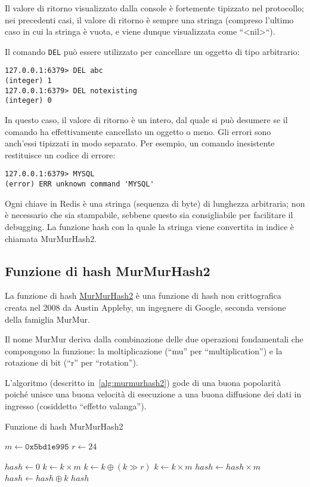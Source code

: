 Il valore di ritorno visualizzato dalla console è fortemente tipizzato nel protocollo;
nei precedenti casi, il valore di ritorno è sempre una stringa (compreso l'ultimo
caso in cui la stringa è vuota, e viene dunque visualizzata come ``<nil>``).

Il comando \verb|DEL| può essere utilizzato per cancellare un oggetto di tipo
arbitrario:

\medskip
\begin{lstlisting}
127.0.0.1:6379> DEL abc
(integer) 1
127.0.0.1:6379> DEL notexisting
(integer) 0
\end{lstlisting}

In questo caso, il valore di ritorno è un intero, dal quale si può desumere se il comando
ha effettivamente cancellato un oggetto o meno. Gli errori sono anch'essi tipizzati in
modo separato. Per esempio, un comando inesistente restituisce un codice di errore:

\medskip
\begin{lstlisting}
127.0.0.1:6379> MYSQL
(error) ERR unknown command 'MYSQL'
\end{lstlisting}

Ogni chiave in Redis è una stringa (sequenza di byte) di lunghezza arbitraria; non è
necessario che sia stampabile, sebbene questo sia consigliabile per facilitare il
debugging. La funzione hash con la quale la stringa viene convertita in indice è
chiamata MurMurHash2.

\subsection{Funzione di hash MurMurHash2}

La funzione di hash \href{https://sites.google.com/site/murmurhash/}{MurMurHash2} è una funzione di
hash non crittografica creata nel 2008 da Austin Appleby, un ingegnere di Google, seconda versione
della famiglia MurMur.

Il nome MurMur deriva dalla combinazione delle due operazioni fondamentali che compongono la
funzione: la moltiplicazione (``mu'' per ``multiplication'') e la rotazione di bit (``r'' per
``rotation''). 

L'algoritmo (descritto in~\ref{alg:murmurhash2}) gode di una buona popolarità poiché unisce una
buona velocità di esecuzione a una buona diffusione dei dati in ingresso (cosiddetto ``effetto
valanga'').

\begin{algorithm}
\caption{Funzione di hash MurMurHash2}
\label{alg:murmurhash2}
\begin{algorithmic}[1]
	\State $m \gets \mathtt{0x5bd1e995}$ 
	\State $r \gets 24$ 

	\State $hash \gets 0$
		\State $k \gets k \times m$
		\State $k \gets k \oplus (k \gg r)$
		\State $k \gets k \times m$
		\State $hash \gets hash \times m$
		\State $hash \gets hash \oplus k$
	\EndFor
	\State \Return $hash$
\EndProcedure
\end{algorithmic}
\end{algorithm}

